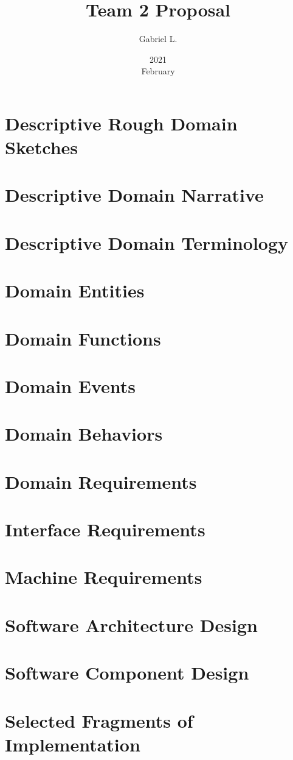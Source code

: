 \documentclass{article}
\title{Team 2 Proposal}
\date{2021 \\ February}
\author{Gabriel L.}
\begin{document}
\maketitle
\section{Descriptive Rough Domain Sketches}

\section{Descriptive Domain Narrative}
\section{Descriptive Domain Terminology}
\section{Domain Entities}
\section{Domain Functions}
\section{Domain Events}
\section{Domain Behaviors}
\section{Domain Requirements}
\section{Interface Requirements}
\section{Machine Requirements}
\section{Software Architecture Design}
\section{Software Component Design}
\section{Selected Fragments of Implementation}
\end{document}
